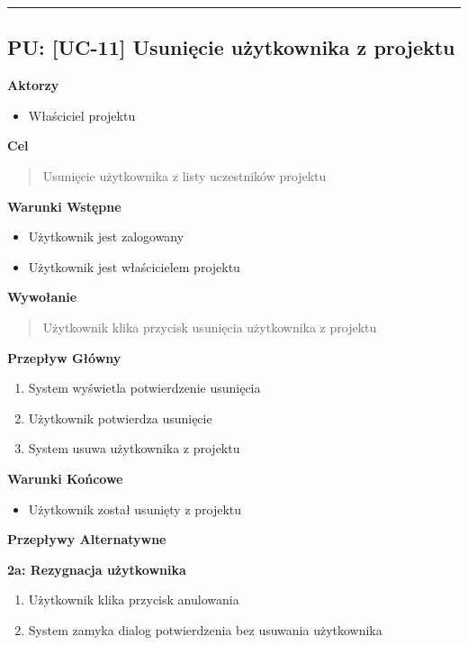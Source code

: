 \hrule
\vspace{1cm}

\subsection*{PU: [UC-11] Usunięcie użytkownika z projektu}

\noindent\textbf{Aktorzy}
\begin{itemize}
    \item Właściciel projektu
\end{itemize}

\vspace{0.2cm}
\noindent\textbf{Cel}
\begin{quote}
    Usunięcie użytkownika z listy uczestników projektu
\end{quote}

\vspace{0.2cm}
\noindent\textbf{Warunki Wstępne}
\begin{itemize}
    \item Użytkownik jest zalogowany
    \item Użytkownik jest właścicielem projektu
\end{itemize}

\vspace{0.2cm}
\noindent\textbf{Wywołanie}
\begin{quote}
    Użytkownik klika przycisk usunięcia użytkownika z projektu
\end{quote}

\vspace{0.2cm}
\noindent\textbf{Przepływ Główny}
\begin{enumerate}
    \item System wyświetla potwierdzenie usunięcia
    \item Użytkownik potwierdza usunięcie
    \item System usuwa użytkownika z projektu
\end{enumerate}

\vspace{0.2cm}
\noindent\textbf{Warunki Końcowe}
\begin{itemize}
    \item Użytkownik został usunięty z projektu
\end{itemize}

\vspace{0.2cm}
\noindent\textbf{Przepływy Alternatywne}

\textbf{2a: Rezygnacja użytkownika}
\begin{enumerate}
    \item Użytkownik klika przycisk anulowania
    \item System zamyka dialog potwierdzenia bez usuwania użytkownika
\end{enumerate}


